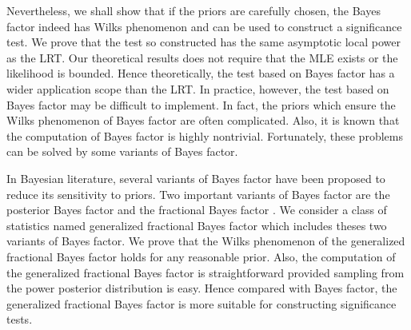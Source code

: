 \documentclass[11pt]{article}
\newcommand\CG[1]{\textcolor{red}{#1}}
\theoremstyle{plain}
\theoremstyle{definition}
\theoremstyle{remark}
\begin{document}
Nevertheless, we shall show that if the priors are carefully chosen, the Bayes factor indeed has Wilks phenomenon and can be used to construct a significance test.
We prove that the test so constructed has the same asymptotic local power as the LRT.
Our theoretical results does not require that the MLE exists or the likelihood is bounded.
Hence theoretically, the test based on Bayes factor has a wider application scope than the LRT.
In practice, however, the test based on Bayes factor may be difficult to implement.
In fact, the priors which ensure the Wilks phenomenon of Bayes factor are often complicated.
Also, it is known that the computation of Bayes factor is highly nontrivial.
Fortunately, these problems can be solved by some variants of Bayes factor.

In Bayesian literature, several variants of Bayes factor have been proposed to reduce its sensitivity to priors.
Two important variants of Bayes factor are the posterior Bayes factor \citep{Aitkin1991Posterior} and the fractional Bayes factor \citep{Fractional1995}.
We consider a class of statistics named generalized fractional Bayes factor which includes theses two variants of Bayes factor.
We prove that the Wilks phenomenon of the generalized fractional Bayes factor holds for any reasonable prior.
Also, the computation of the generalized fractional Bayes factor is straightforward provided sampling from the power posterior distribution is easy.
Hence compared with Bayes factor, the generalized fractional Bayes factor is more suitable for constructing significance tests.



\end{document}
